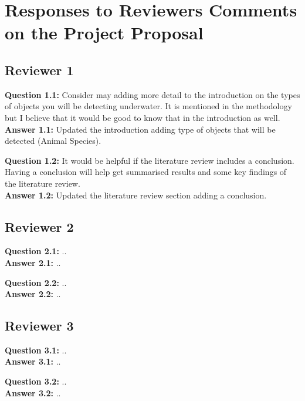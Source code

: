 \appendix

\section{Responses to Reviewers Comments on the Project Proposal}

\vspace{1em}

\subsection{Reviewer 1}

\textbf{Question 1.1:} Consider may adding more detail to the introduction on the types of objects you will be detecting underwater. It is mentioned in the methodology but I believe that it would be good to know that in the introduction as well.\\
\textbf{Answer 1.1:} Updated the introduction adding type of objects that will be detected (Animal Species).

\vspace{1em}

\textbf{Question 1.2:} It would be helpful if the literature review includes a conclusion. Having a conclusion will help get summarised results and some key findings of the literature review.\\
\textbf{Answer 1.2:} Updated the literature review section adding a conclusion.

\vspace{1em}

\subsection{Reviewer 2}

\textbf{Question 2.1:} ..\\
\textbf{Answer 2.1:} ..

\vspace{1em}

\textbf{Question 2.2:} ..\\
\textbf{Answer 2.2:} ..

\vspace{1em}

\subsection{Reviewer 3}

\textbf{Question 3.1:} ..\\
\textbf{Answer 3.1:} ..

\vspace{1em}

\textbf{Question 3.2:} ..\\
\textbf{Answer 3.2:} ..
